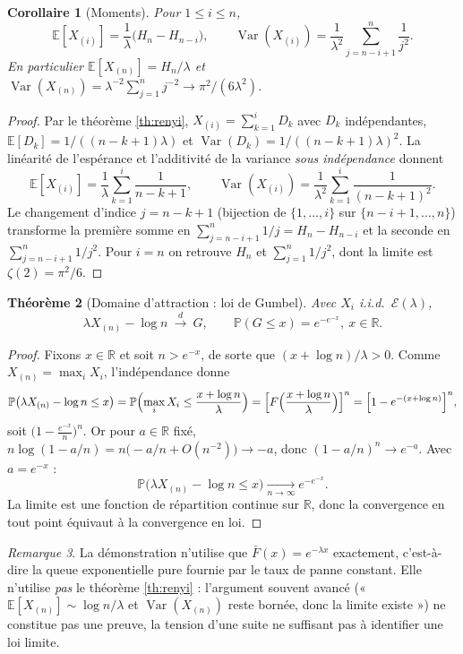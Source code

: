 \documentclass[11pt,a4paper]{article}
\theoremstyle{plain}
\newtheorem{theoreme}{Théorème}[section]
\newtheorem{corollaire}[theoreme]{Corollaire}
\theoremstyle{definition}
\theoremstyle{remark}
\newtheorem{remarque}[theoreme]{Remarque}
\newcommand{\R}{\mathbb{R}}
\newcommand{\E}{\mathbb{E}}
\newcommand{\Prob}{\mathbb{P}}
\newcommand{\Var}{\operatorname{Var}}
\newcommand{\Expo}{\mathcal{E}}
\newcommand{\barF}{\bar{F}}
\newcommand{\cvloi}{\xrightarrow{\ d\ }}
\newcommand{\Xord}[1]{X_{(#1)}}
\begin{document}
\begin{corollaire}[Moments]
Pour $1\le i\le n$,
\[
\E[\Xord i]=\frac{1}{\lambda}\bigl(H_n-H_{n-i}\bigr),
\qquad
\Var(\Xord i)=\frac{1}{\lambda^2}\sum_{j=n-i+1}^{n}\frac{1}{j^2}.
\]
En particulier $\E[\Xord n]=H_n/\lambda$ et
$\Var(\Xord n)=\lambda^{-2}\sum_{j=1}^n j^{-2}\to\pi^2/(6\lambda^2)$.
\end{corollaire}

\begin{proof}
Par le théorème \ref{th:renyi}, $\Xord i=\sum_{k=1}^i D_k$ avec $D_k$
indépendantes, $\E[D_k]=1/((n-k+1)\lambda)$ et
$\Var(D_k)=1/((n-k+1)\lambda)^2$. La linéarité de l'espérance et l'additivité de
la variance \emph{sous indépendance} donnent
\[
\E[\Xord i]=\frac1\lambda\sum_{k=1}^i\frac{1}{n-k+1},
\qquad
\Var(\Xord i)=\frac1{\lambda^2}\sum_{k=1}^i\frac{1}{(n-k+1)^2}.
\]
Le changement d'indice $j=n-k+1$ (bijection de $\{1,\dots,i\}$ sur
$\{n-i+1,\dots,n\}$) transforme la première somme en
$\sum_{j=n-i+1}^n 1/j=H_n-H_{n-i}$ et la seconde en $\sum_{j=n-i+1}^n 1/j^2$.
Pour $i=n$ on retrouve $H_n$ et $\sum_{j=1}^n 1/j^2$, dont la limite est
$\zeta(2)=\pi^2/6$.
\end{proof}

\begin{theoreme}[Domaine d'attraction : loi de Gumbel]
Avec $X_i$ i.i.d.\ $\Expo(\lambda)$,
\[
\lambda\Xord n-\log n\ \cvloi\ G,\qquad \Prob(G\le x)=e^{-e^{-x}},\ x\in\R .
\]
\end{theoreme}

\begin{proof}
Fixons $x\in\R$ et soit $n>e^{-x}$, de sorte que $(x+\log n)/\lambda>0$. Comme
$\Xord n=\max_i X_i$, l'indépendance donne
\[
\Prob\bigl(\lambda\Xord n-\log n\le x\bigr)
=\Prob\Bigl(\max_i X_i\le\frac{x+\log n}{\lambda}\Bigr)
=\Bigl[F\Bigl(\frac{x+\log n}{\lambda}\Bigr)\Bigr]^{n}
=\Bigl[1-e^{-(x+\log n)}\Bigr]^{n},
\]
soit $\bigl(1-\frac{e^{-x}}{n}\bigr)^{n}$. Or pour $a\in\R$ fixé,
$n\log(1-a/n)=n\bigl(-a/n+O(n^{-2})\bigr)\to-a$, donc
$(1-a/n)^n\to e^{-a}$. Avec $a=e^{-x}$ :
\[
\Prob\bigl(\lambda\Xord n-\log n\le x\bigr)\xrightarrow[n\to\infty]{}e^{-e^{-x}} .
\]
La limite est une fonction de répartition continue sur $\R$, donc la convergence
en tout point équivaut à la convergence en loi.
\end{proof}

\begin{remarque}
La démonstration n'utilise que $\barF(x)=e^{-\lambda x}$ exactement, c'est-à-dire
la queue exponentielle pure fournie par le taux de panne constant. Elle
n'utilise \emph{pas} le théorème \ref{th:renyi} : l'argument souvent avancé
(« $\E[\Xord n]\sim\log n/\lambda$ et $\Var(\Xord n)$ reste bornée, donc la
limite existe ») ne constitue pas une preuve, la tension d'une suite ne
suffisant pas à identifier une loi limite.
\end{remarque}
\end{document}
